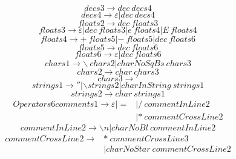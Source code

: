 \documentclass[UTF8]{ctexart}
\begin{document}
\begin{equation}
	decs3 \rightarrow dec \ decs4
\end{equation}
\begin{equation}
	decs4 \rightarrow \varepsilon | dec \ decs4
\end{equation}
\begin{equation}
	floats2 \rightarrow dec \ floats3
\end{equation}
\begin{equation}
	floats3 \rightarrow \varepsilon | dec \ floats3 | e \ floats4 | E \ floats4
\end{equation}
\begin{equation}
	floats4 \rightarrow + \ floats5 | - \ floats5 | dec \ floats6
\end{equation}
\begin{equation}
	floats5 \rightarrow dec \ floats6
\end{equation}
\begin{equation}
	floats6 \rightarrow \varepsilon | dec \ floats6
\end{equation}
\begin{equation}
	chars1 \rightarrow \backslash \ chars2 | charNoSqBs \ chars3
\end{equation}
\begin{equation}
	chars2 \rightarrow char \ chars3
\end{equation}
\begin{equation}
	chars3 \rightarrow '
\end{equation}
\begin{equation}
	strings1 \rightarrow '' | \backslash strings2 | charInString \ strings1
\end{equation}
\begin{equation}
	strings2 \rightarrow char \ strings1
\end{equation}
\begin{equation}
	\begin{aligned}
		Operators6comments1 \rightarrow \varepsilon | = & | / \ commentInLine2   \\
		                                                & |* \ commentCrossLine2
	\end{aligned}
\end{equation}
\begin{equation}
	commentInLine2 \rightarrow \backslash n | charNoBl \ commentInLine2
\end{equation}
\begin{equation}
	\begin{aligned}
		commentCrossLine2 \rightarrow & * \ commentCrossLine3            \\
		                              & | charNoStar \ commentCrossLine2
	\end{aligned}
\end{equation}
\end{document}
